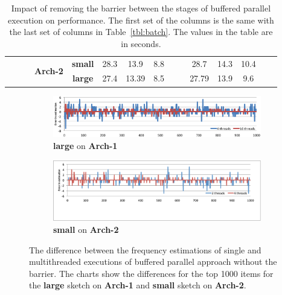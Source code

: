 \documentclass[10pt, conference, compsocconf]{IEEEtran}
\begin{document}
\begin{table}[htbp]
{\begin{tabular}{ccccc||ccccc|ccccc}
			&&&\multirow{2}{*}{\textbf{Arch-2}} & \textbf{small}  & 28.3    & 13.9   & 8.8   &        &       &  28.7    &  14.3   & 10.4   &        &       \\
			&&&& \textbf{large} &  27.4      &   13.39     &       8.5 &        &       &     27.79    &     13.9    &     9.6   &        &   \\ %
		\end{tabular}
	}
\caption{Impact of removing the barrier between the stages of buffered parallel execution on performance. The first set of the columns is the same with the last set of columns in Table~\ref{tbl:batch}. The values in the table are in seconds.}
\label{tbl:barrier}
\end{table}

\begin{figure}[htbp]
\begin{center}
\begin{subfigure}[t]{\textwidth}
\includegraphics[width=\linewidth]{error1.png}
\caption{{\bf large} on {\bf Arch-1}}
\label{fig:err1}
\end{subfigure}
\end{center}

\begin{center}
\begin{subfigure}[t]{\textwidth}
\includegraphics[width=\linewidth]{error2.pdf}
\caption{{\bf small} on {\bf Arch-2}}
\label{fig:err2}
\end{subfigure}
\end{center}

\caption{The difference between the frequency estimations of single and multithreaded executions of buffered parallel approach without the barrier. The charts show the differences for the top 1000 items for the {\bf large} sketch on {\bf Arch-1} and {\bf small} sketch on {\bf Arch-2}.}
\label{fig:err}
\end{figure}
\end{document}
